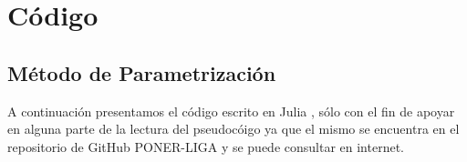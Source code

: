 \chapter{Código }

\section{Método de Parametrización}
A continuación presentamos el código escrito en Julia , sólo con el fin de apoyar en alguna parte de la lectura del pseudocóigo ya que el mismo se encuentra en el repositorio de GitHub PONER-LIGA y se puede consultar en internet.

